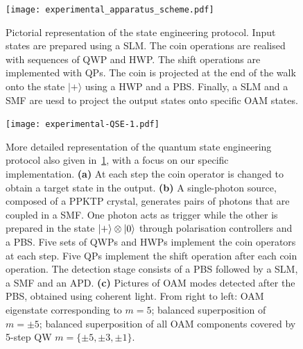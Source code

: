 
\begin{figure}[tb]
\centering
\texttt{[image: experimental\_apparatus\_scheme.pdf]}
\caption{
    Pictorial representation of the state engineering protocol.
    Input states are prepared using a \ac{SLM}.
    The coin operations are realised with sequences of \ac{QWP} and \ac{HWP}.
    The shift operations are implemented with \acp{QP}.
    The coin is projected at the end of the walk onto the state $\vert + \rangle$ using a \ac{HWP} and a \ac{PBS}.
    Finally, a \ac{SLM} and a \ac{SMF} are uesd to project the output states onto specific \ac{OAM} states.
}
\label{fig:expQWs:proposal_exp}
\end{figure}

\begin{figure}[tb]
\texttt{[image: experimental-QSE-1.pdf]}
\caption{
	More detailed representation of the quantum state engineering protocol also given in~\cref{fig:expQWs:proposal_exp}, with a focus on our specific implementation.
	\textbf{(a)} At each step the coin operator is changed to obtain a target state in the output.
	\textbf{(b)} A single-photon source, composed of a \ac{PPKTP} crystal, generates pairs of photons that are coupled in a SMF. One photon acts as trigger while the other is prepared in the state $\ket{+}\otimes \ket{0}$ through polarisation controllers and a \ac{PBS}. Five sets of \acp{QWP} and \acp{HWP} implement the coin operators at each step. Five \acp{QP} implement the shift operation after each coin operation.
	The detection stage consists of a \ac{PBS} followed by a \ac{SLM}, a \ac{SMF} and an \ac{APD}.
	\textbf{(c)} Pictures of \ac{OAM} modes detected after the \ac{PBS}, obtained using coherent light. From right to left: \ac{OAM} eigenstate corresponding to $m=5$; balanced superposition of $m=\pm 5$; balanced superposition of all \ac{OAM} components covered by 5-step \ac{QW} $m=\{\pm 5, \pm 3, \pm 1\}$.
}
\label{fig:expQWs:schematics}
\end{figure}

